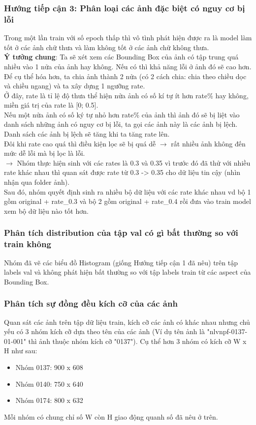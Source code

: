 \documentclass[a4paper,12pt]{article}
\begin{document}
\subsubsection{Hướng tiếp cận 3: Phân loại các ảnh đặc biệt có nguy cơ bị lỗi}
Trong một lần train với số epoch thấp thì vô tình phát hiện được ra là model làm tốt ở các ảnh chữ thưa và làm không tốt ở các ảnh chữ không thưa.
\\
\textbf{Ý tưởng chung}: Ta sẽ xét xem các Bounding Box của ảnh có tập trung quá nhiều vào 1 nửa của ảnh hay không. Nếu có thì khả năng lỗi ở ảnh đó sẽ cao hơn.
Để cụ thể hóa hơn, ta chia ảnh thành 2 nửa (có 2 cách chia: chia theo chiều dọc và chiều ngang) và ta xây dựng 1 ngưỡng rate.
\\
Ở đây, rate là tỉ lệ độ thưa thể hiện nửa ảnh có số kí tự ít hơn rate\% hay không, miền giá trị của rate là [0; 0.5].
\\
Nếu một nửa ảnh có số ký tự nhỏ hơn rate\% của ảnh thì ảnh đó sẽ bị liệt vào danh sách những ảnh có nguy cơ bị lỗi, ta gọi các ảnh này là các ảnh bị lệch.
\\
Danh sách các ảnh bị lệch sẽ tăng khi ta tăng rate lên.
\\
Đôi khi rate cao quá thì điều kiện lọc sẽ bị quá dễ $\rightarrow$ rất nhiều ảnh không đến mức dễ lỗi mà bị lọc là lỗi.
\\
$\rightarrow$ Nhóm thực hiện sinh với các rates là 0.3 và 0.35 vì trước đó đã thử với nhiều rate khác nhau thì quan sát được rate từ 0.3 -> 0.35 cho dữ liệu tin cậy (nhìn nhận qua folder ảnh).
\\
Sau đó, nhóm quyết định sinh ra nhiều bộ dữ liệu với các rate khác nhau vd bộ 1 gồm original + rate\_0.3 và bộ 2 gồm original + rate\_0.4 rồi đưa vào train model xem bộ dữ liệu nào tốt hơn. 
\subsubsection{Phân tích distribution của tập val có gì bất thường so với train không}
Nhóm đã vẽ các biểu đồ Histogram (giống Hướng tiếp cận 1 đã nêu) trên tập labels val và không phát hiện bất thường so với tập labels train từ các aspect của Bounding Box.
\subsubsection{Phân tích sự đồng đều kích cỡ của các ảnh}
Quan sát các ảnh trên tập dữ liệu train, kích cỡ các ảnh có khác nhau nhưng chủ yếu có 3 nhóm kích cỡ dựa theo tên của các ảnh (Ví dụ tên ảnh là "nlvnpf-0137-01-001" thì ảnh thuộc nhóm kích cỡ "0137"). Cụ thể hơn 3 nhóm có kích cỡ W x H như sau:
\begin{itemize}
    \item Nhóm 0137: 900 x 608
    \item Nhóm 0140: 750 x 640
    \item Nhóm 0174: 800 x 632
\end{itemize}
Mỗi nhóm có chung chỉ số W còn H giao động quanh số đã nêu ở trên.
\end{document}
